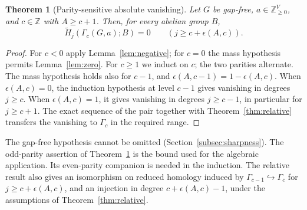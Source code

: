 \documentclass[11pt,a4paper]{article}
\newtheorem{theorem}{Theorem}
\theoremstyle{definition}
\newcommand{\Ht}{\widetilde H}
\newcommand{\ZZ}{\mathbb Z}
\newcommand{\NN}{\mathbb Z_{\geq 0}}
\newcommand{\G}{\Gamma}
\begin{document}
\begin{theorem}[Parity-sensitive absolute vanishing]\label{thm:C}
Let $G$ be gap-free, $a\in\NN^V$, and $c\in\ZZ$ with $A\geq c+1$. Then, for every abelian group $B$,
\begin{equation}\label{eq:C}
 \Ht_j(\G_c(G,a);B)=0\qquad(j\geq c+\epsilon(A,c)).
\end{equation}
\end{theorem}
\begin{proof}
For $c<0$ apply Lemma~\ref{lem:negative}; for $c=0$ the mass hypothesis permits Lemma~\ref{lem:zero}. For $c\geq1$ we induct on $c$; the two parities alternate. The mass hypothesis holds also for $c-1$, and $\epsilon(A,c-1)=1-\epsilon(A,c)$. When $\epsilon(A,c)=0$, the induction hypothesis at level $c-1$ gives vanishing in degrees $j\geq c$. When $\epsilon(A,c)=1$, it gives vanishing in degrees $j\geq c-1$, in particular for $j\geq c+1$. The exact sequence of the pair together with Theorem~\ref{thm:relative} transfers the vanishing to $\G_c$ in the required range.
\end{proof}
The gap-free hypothesis cannot be omitted (Section~\ref{subsec:sharpness}). The odd-parity assertion of Theorem~\ref{thm:C} is the bound used for the algebraic application. Its even-parity companion is needed in the induction. The relative result also gives an isomorphism on reduced homology induced by $\G_{c-1}\hookrightarrow\G_c$ for $j\geq c+\epsilon(A,c)$, and an injection in degree $c+\epsilon(A,c)-1$, under the assumptions of Theorem~\ref{thm:relative}.
\end{document}
